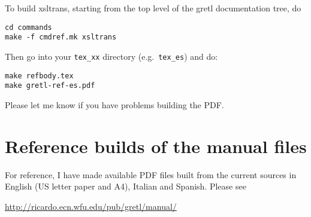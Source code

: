 \documentclass{article}
\begin{document}
To build \textsf{xsltrans}, starting from the top level of the
\textsf{gretl} documentation tree, do

\begin{verbatim}
cd commands
make -f cmdref.mk xsltrans
\end{verbatim}

Then go into your \texttt{tex\_xx} directory (e.g.\ \texttt{tex\_es})
and do:

\begin{verbatim}
make refbody.tex
make gretl-ref-es.pdf
\end{verbatim}

Please let me know if you have problems building the PDF.

\section{Reference builds of the manual files}

For reference, I have made available PDF files built from the current
sources in English (US letter paper and A4), Italian and Spanish.
Please see

\begin{center}
\url{http://ricardo.ecn.wfu.edu/pub/gretl/manual/} 
\end{center}
\end{document}
